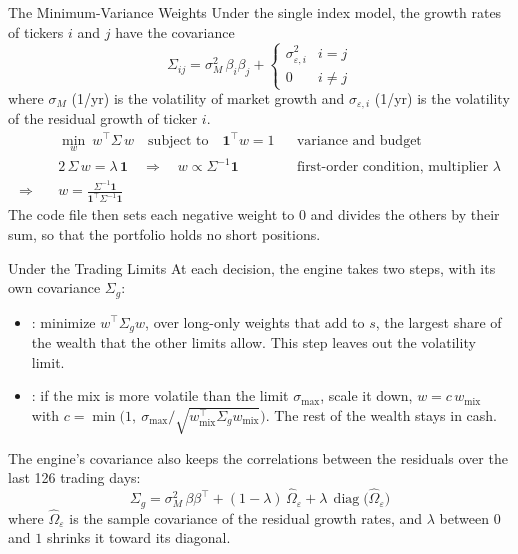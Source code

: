 \documentclass[aspectratio=169,11pt]{beamer}
\begin{document}
\begin{frame}{The Minimum-Variance Weights}
  \vspace{0.3em}
  Under the single index model, the growth rates of tickers $i$ and $j$ have the covariance
  \[
    \Sigma_{ij}=\sigma_{M}^{2}\,\beta_{i}\beta_{j}+\begin{cases}\sigma_{\varepsilon,i}^{2}&i=j\\0&i\neq j\end{cases}
  \]
  where $\sigma_{M}$ (1/yr) is the volatility of market growth and $\sigma_{\varepsilon,i}$ (1/yr) is the
  volatility of the residual growth of ticker $i$.
  {\setlength{\jot}{2pt}
  \begin{align*}
    &\min_{w}\ w^{\top}\Sigma\,w\quad\text{subject to}\quad\mathbf{1}^{\top}w=1 && \text{variance and budget}\\
    &2\,\Sigma\,w=\lambda\,\mathbf{1}\quad\Longrightarrow\quad w\propto\Sigma^{-1}\mathbf{1}
      && \text{first-order condition, multiplier }\lambda\\
    \Longrightarrow\quad&\boxed{w=\frac{\Sigma^{-1}\mathbf{1}}{\mathbf{1}^{\top}\Sigma^{-1}\mathbf{1}}}
  \end{align*}}%
  The code file then sets each negative weight to $0$ and divides the others by their sum, so that the
  portfolio holds no short positions.
\end{frame}

\begin{frame}{Under the Trading Limits}
  \vspace{0.3em}
  At each decision, the engine takes two steps, with its own covariance $\Sigma_{g}$:
  \begin{itemize}\setlength{\itemsep}{0.4em}
    \item {}: minimize $w^{\top}\Sigma_{g}w$, over long-only weights that add to $s$, the largest share of the wealth that the other limits allow. This step leaves out the volatility limit.
    \item {}: if the mix is more volatile than the limit $\sigma_{\max}$, scale it down, $w=c\,w_{\text{mix}}$ with $c=\min\big(1,\ \sigma_{\max}\big/\sqrt{w_{\text{mix}}^{\top}\Sigma_{g}w_{\text{mix}}}\big)$. The rest of the wealth stays in cash.
  \end{itemize}

  The engine's covariance also keeps the correlations between the residuals over the last 126 trading days:
  \[
    \Sigma_{g}=\sigma_{M}^{2}\,\beta\beta^{\top}+(1-\lambda)\,\hat{\Omega}_{\varepsilon}+\lambda\,\operatorname{diag}\big(\hat{\Omega}_{\varepsilon}\big)
  \]
  where $\hat{\Omega}_{\varepsilon}$ is the sample covariance of the residual growth rates, and $\lambda$
  between $0$ and $1$ shrinks it toward its diagonal.
\end{frame}
\end{document}
